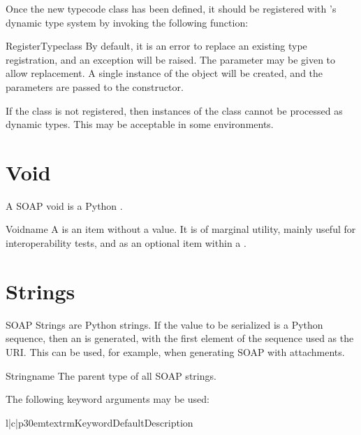 Once the new typecode class has been defined, it should be registered with
\ZSI{}'s dynamic type system by invoking the following function:

\begin{funcdesc}{RegisterType}{class}
By default, it is an error to replace an existing type registration, and
an exception will be raised.
The  parameter may be given to allow replacement.
A single instance of the  object will be created, and
the  parameters are passed to the constructor.
\end{funcdesc}

If the class is not registered, then instances of the class cannot be
processed as dynamic types.
This may be acceptable in some environments.

\section{Void}

A SOAP void is a Python .

\begin{classdesc}{Void}{name}
A  is an item without a value.
It is of marginal utility, mainly useful for interoperability tests, and
as an optional item within a .
\end{classdesc}

\section{Strings}

SOAP Strings are Python strings.
If the value to be serialized is a Python sequence, then an 
is generated, with the first element of the sequence used as the URI.
This can be used, for example, when generating SOAP with attachments.

\begin{classdesc}{String}{name}
The parent type of all SOAP strings.

The following keyword arguments may be used:

\begin{tableiii}{l|c|p{30em}}{textrm}{Keyword}{Default}{Description}
\end{tableiii}
\end{classdesc}

